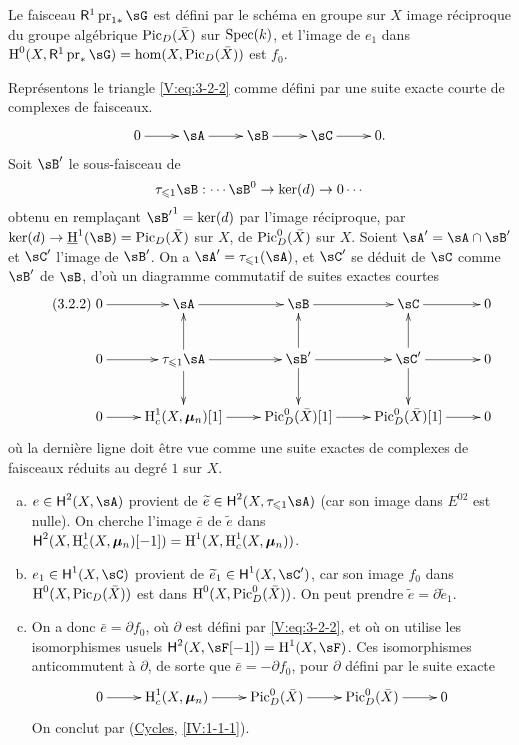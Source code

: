 Le faisceau $\R^1\operatorname{pr}_{1\ast}\sG$ est défini par le schéma en 
groupe sur $X$ image réciproque du groupe algébrique $\operatorname{Pic}_D(\bar X)$ sur 
$\operatorname{Spec}(k)$, et l'image de $e_1$ dans 
$\h^0(X,\R^1\operatorname{pr}_\ast\sG) = \hom(X,\pic_D(\bar X))$ est $f_0$. 

Représentons le triangle \eqref{V:eq:3-2-2} comme défini par une suite 
exacte courte de complexes de faisceaux.
\[\xymatrix{
  0 \ar[r] 
    & \sA \ar[r] 
    & \sB \ar[r] 
    & \sC \ar[r] 
    & 0 \text{.}
}\]
Soit $\sB'$ le sous-faisceau de 
\[
  \tau_{\leqslant 1} \sB : \cdots \sB^0 \to \ker(d) \to 0 \cdots
\]
obtenu en remplaçant ${\sB'}^1=\ker(d)$ par l'image réciproque, par 
$\ker(d)\to \underline\h^1(\sB) = \pic_D(\bar X)$ sur $X$, de 
$\operatorname{Pic}_D^0(\bar X)$ sur $X$. Soient $\sA'=\sA\cap \sB'$ et $\sC'$ l'image de 
$\sB'$. On a $\sA'=\tau_{\leqslant 1}(\sA)$, et $\sC'$ se déduit de $\sC$ 
comme $\sB'$ de $\sB$, d'où un diagramme commutatif de suites exactes courtes 
\begin{equation*}\tag{3.2.2}\label{V:eq:3-2-2}
\xymatrix{
  0 \ar[r] 
    & \sA \ar[r] 
    & \sB \ar[r] 
    & \sC \ar[r] 
    & 0 \\
  0 \ar[r] 
    & \tau_{\leqslant 1} \sA \ar[r] \ar[u] \ar[d] 
    & \sB' \ar[r] \ar[u] \ar[d] 
    & \sC' \ar[r] \ar[u] \ar[d] 
    & 0 \\
  0 \ar[r] 
    & \h_c^1(X,\dmu_n)[1] \ar[r] 
    & \pic_D^0(\bar X)[1] \ar[r] 
    & \pic_D^0(\bar X)[1] \ar[r] 
    & 0
}
\end{equation*}
où la dernière ligne doit être vue comme une suite exactes de complexes 
de faisceaux réduits au degré $1$ sur $X$. 
\begin{enumerate}[a)]
  \item $e\in \hh^2(X,\sA)$ provient de 
    $\widetilde e\in \hh^2(X,\tau_{\leqslant 1}\sA)$ (car son image dans 
    $E^{02}$ est nulle). On cherche l'image $\bar e$ de $\widetilde e$ dans 
    $\operatorname{\mathsf{H}}^2(X,\operatorname{H}_c^1(X,{\bm\mu}_n)[-1]) = \operatorname{H}^1(X,\operatorname{H}_c^1(X,{\bm\mu}_n))$.
  \item $e_1\in \hh^1(X,\sC)$ provient de $\widetilde e_1\in \hh^1(X,\sC')$, 
    car son image $f_0$ dans $\operatorname{H}^0(X,\operatorname{Pic}_D(\bar X))$ est dans 
    $\operatorname{H}^0(X,\operatorname{Pic}_D^0(\bar X))$. On peut prendre 
    $\widetilde e=\partial \widetilde e_1$. 
  \item On a donc $\bar e = \partial f_0$, où $\partial $ est défini par 
    \eqref{V:eq:3-2-2}, et où on utilise les isomorphismes usuels 
    $\hh^2(X,\sF[-1]) = \h^1(X,\sF)$. Ces isomorphismes anticommutent à 
    $\partial$, de sorte que $\bar e=-\partial f_0$, pour $\partial$ défini 
    par le suite exacte 
    \[\xymatrix{
      0 \ar[r] 
        & \h_c^1(X,\dmu_n) \ar[r] 
        & \pic_D^0(\bar X) \ar[r] 
        & \pic_D^0(\bar X) \ar[r] 
        & 0 
    }\]
    On conclut par (\hyperref[IV]{Cycles}, \ref{IV:1-1-1}). 
\end{enumerate}






